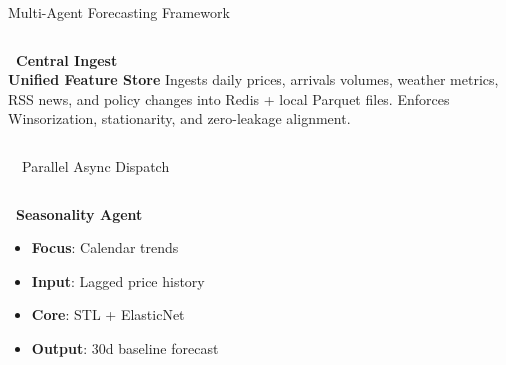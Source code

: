\documentclass{beamer}
\begin{document}
\begin{frame}{Multi-Agent Forecasting Framework}
\vspace{-0.25cm}

\begin{herocard}[0.98\textwidth, top=1.5pt, bottom=1.5pt, left=6pt, right=6pt, boxsep=0.5pt]
    \begin{columns}[c]
        \centering
        \textbf{\textcolor{primaryDark}{\small {}~Central Ingest}}\\
        {\fontsize{5pt}{6pt}\selectfont\color{primaryblue!80}\bfseries Unified Feature Store}
        \fontsize{5.5pt}{6.5pt}\selectfont
        Ingests daily prices, arrivals volumes, weather metrics, RSS news, and policy changes into Redis + local Parquet files. Enforces Winsorization, stationarity, and zero-leakage alignment.
    \end{columns}
\end{herocard}

\vspace{-0.02cm}
{\centering\textcolor{primaryLight}{\fontsize{5pt}{6pt}\selectfont {}~~Parallel Async Dispatch~~}\par}
\vspace{-0.02cm}

\begin{columns}[T]
    \begin{smallcard}[0.98\textwidth, top=2pt, bottom=2.5pt, left=4pt, right=4pt, boxsep=0.5pt]
        \centering
        \textbf{\textcolor{primaryDark}{\fontsize{6.5pt}{7.5pt}\selectfont {}~Seasonality Agent}}
        \vspace{0.05cm}
        \begin{itemize}\setlength\itemsep{0.5pt}\setlength\parskip{0pt}
            \tiny
            \item \textbf{Focus}: Calendar trends
            \item \textbf{Input}: Lagged price history
            \item \textbf{Core}: STL + ElasticNet
            \item \textbf{Output}: 30d baseline forecast
        \end{itemize}
    \end{smallcard}


\end{columns}
\end{frame}
\end{document}
